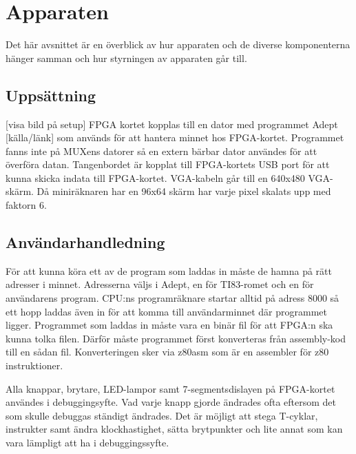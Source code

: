 \documentclass[main.tex]{subfiles}
\begin{document}
\section{Apparaten}
Det här avsnittet är en överblick av hur apparaten och de diverse komponenterna
hänger samman och hur styrningen av apparaten går till.
\subsection{Uppsättning}
[visa bild på setup] FPGA kortet kopplas till en dator med programmet Adept
[källa/länk] som används för att hantera minnet hos FPGA-kortet. Programmet
fanns inte på MUXens datorer så en extern bärbar dator användes för att
överföra datan. Tangenbordet är kopplat till FPGA-kortets USB port för att
kunna skicka indata till FPGA-kortet. VGA-kabeln går till en 640x480 VGA-skärm.
Då miniräknaren har en 96x64 skärm har varje pixel skalats upp med faktorn 6.

\subsection{Användarhandledning}
För att kunna köra ett av de program som laddas in måste de hamna på rätt
adresser i minnet. Adresserna väljs i Adept, en för TI83-romet och en för
användarens program. CPU:ns programräknare startar alltid på adress 8000 så ett
hopp laddas även in för att komma till användarminnet där programmet ligger.
Programmet som laddas in måste vara en binär fil för att FPGA:n ska kunna tolka
filen. Därför måste programmet först konverteras från assembly-kod till en
sådan fil. Konverteringen sker via z80asm som är en assembler för z80
instruktioner.

Alla knappar, brytare, LED-lampor samt 7-segmentsdislayen på FPGA-kortet
användes i debuggingsyfte. Vad varje knapp gjorde ändrades ofta eftersom det
som skulle debuggas ständigt ändrades. Det är möjligt att stega T-cyklar,
instrukter samt ändra klockhastighet, sätta brytpunkter och lite annat som kan
vara lämpligt att ha i debuggingssyfte.

\clearpage
\end{document}
